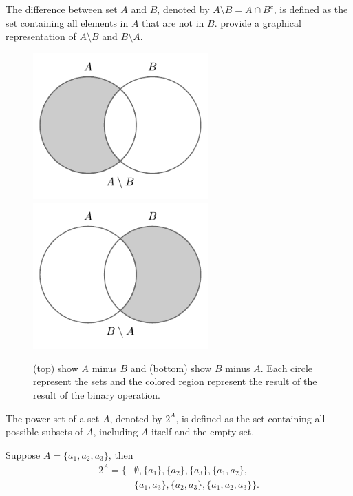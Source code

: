 \begin{definition}[Difference]
	The difference between set $A$ and $B$, denoted by $A \setminus B = A\cap B^c$, is defined as the set containing all elements in $A$ that are not in $B$.  provide a graphical representation of $A\setminus B$ and $B\setminus A$.
	\begin{figure}[H]
		\centering
		\includegraphics[width = 0.6\textwidth]{figures/set_minus.pdf}
		\includegraphics[width = 0.6\textwidth]{figures/set_minus2.pdf}
		\caption{(top) show $A$ minus $B$ and (bottom) show $B$ minus $A$. Each circle represent the sets and the colored region represent the result of the result of the binary operation.}
		\label{fig:set_minus}
	\end{figure}
\end{definition}

\begin{definition}
	The power set of a set $A$, denoted by $2^A$, is defined as the set containing all possible subsets of $A$, including $A$ itself and the empty set.
\end{definition}

\begin{example}
	Suppose $A = \{a_1,a_2,a_3\}$, then
	\begin{equation}
		\begin{split}
			2^A = \{&\emptyset, \{a_1\}, \{a_2\}, \{a_3\}, \{a_1, a_2\},\\
			& \{a_1, a_3\}, \{a_2, a_3\}, \{a_1, a_2, a_3\}\}.
		\end{split}
	\end{equation}
\end{example}

